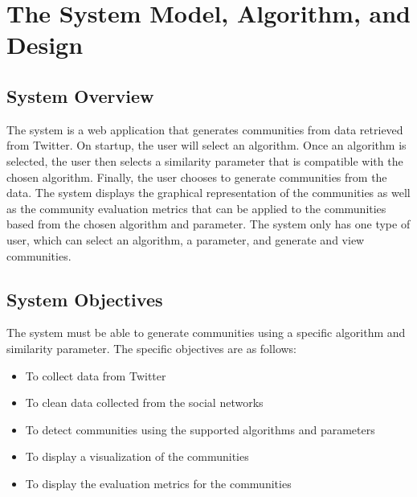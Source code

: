 %
%
%                 




\chapter{The System Model, Algorithm, and Design}
\label{sec:sysmodel}




\section{System Overview}
The system is a web application that generates communities from data retrieved from Twitter. 
On startup, the user will select an algorithm. Once an algorithm is selected, the user then selects a similarity parameter that is compatible
with the chosen algorithm. Finally, the user chooses to generate communities from the data. The system displays 
the graphical representation of the communities as well as the community evaluation metrics that can be applied 
to the communities based from the chosen algorithm and parameter. The system only has one type of user, which 
can select an algorithm, a parameter, and generate and view communities.




\section{System Objectives}
The system must be able to generate communities using a specific algorithm and similarity parameter. The specific objectives are as follows:




\begin{itemize}
	\item To collect data from Twitter
	\item To clean data collected from the social networks
	\item To detect communities using the supported algorithms and parameters
	\item To display a visualization of the communities
	\item To display the evaluation metrics for the communities
\end{itemize}




